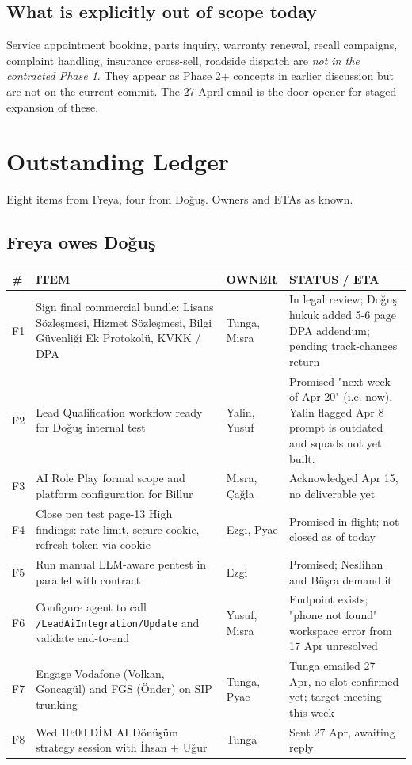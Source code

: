 \documentclass[10pt,a4paper]{article}
\begin{document}
\subsection{What is explicitly out of scope today}

Service appointment booking, parts inquiry, warranty renewal, recall campaigns, complaint handling, insurance cross-sell, roadside dispatch are \emph{not in the contracted Phase 1}. They appear as Phase 2+ concepts in earlier discussion but are not on the current commit. The 27 April email is the door-opener for staged expansion of these.

\newpage

\section{Outstanding Ledger}

Eight items from Freya, four from Doğuş. Owners and ETAs as known.

\subsection{Freya owes Doğuş}

\begin{tabularx}{\linewidth}{@{}L{0.5cm}L{6.0cm}L{2.4cm}X@{}}
\toprule
{}\textbf{\color{white}\footnotesize \#} & \textbf{\color{white}\footnotesize ITEM} & \textbf{\color{white}\footnotesize OWNER} & \textbf{\color{white}\footnotesize STATUS / ETA} \\
\midrule
F1 & Sign final commercial bundle: Lisans Sözleşmesi, Hizmet Sözleşmesi, Bilgi Güvenliği Ek Protokolü, KVKK / DPA & Tunga, Mısra & In legal review; Doğuş hukuk added 5-6 page DPA addendum; pending track-changes return \\
F2 & Lead Qualification workflow ready for Doğuş internal test & Yalin, Yusuf & Promised "next week of Apr 20" (i.e. now). Yalin flagged Apr 8 prompt is outdated and squads not yet built. \\
F3 & AI Role Play formal scope and platform configuration for Billur & Mısra, Çağla & Acknowledged Apr 15, no deliverable yet \\
F4 & Close pen test page-13 High findings: rate limit, secure cookie, refresh token via cookie & Ezgi, Pyae & Promised in-flight; not closed as of today \\
F5 & Run manual LLM-aware pentest in parallel with contract & Ezgi & Promised; Neslihan and Büşra demand it \\
F6 & Configure agent to call \texttt{/LeadAiIntegration/Update} and validate end-to-end & Yusuf, Mısra & Endpoint exists; "phone not found" workspace error from 17 Apr unresolved \\
F7 & Engage Vodafone (Volkan, Goncagül) and FGS (Önder) on SIP trunking & Tunga, Pyae & Tunga emailed 27 Apr, no slot confirmed yet; target meeting this week \\
F8 & Wed 10:00 DİM AI Dönüşüm strategy session with İhsan + Uğur & Tunga & Sent 27 Apr, awaiting reply \\
\bottomrule
\end{tabularx}
\end{document}

